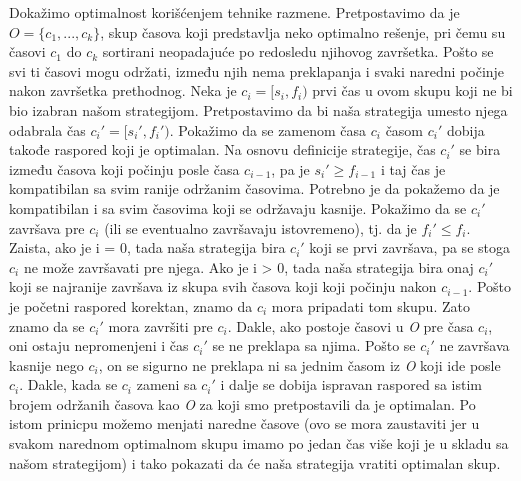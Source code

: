 \documentclass{article}
\begin{document}
Dokažimo optimalnost korišćenjem tehnike razmene. Pretpostavimo da je $O = \{c_1,..., c_k\}$, skup časova koji predstavlja neko optimalno rešenje, pri čemu
su časovi $c_1$ do $c_k$ sortirani neopadajuće po redosledu njihovog završetka. Pošto se svi ti
časovi mogu održati, između njih nema preklapanja i svaki naredni počinje nakon
završetka prethodnog. Neka je $c_i = [s_i , f_i)$ prvi čas u
ovom skupu koji ne bi bio izabran našom strategijom. Pretpostavimo da bi naša
strategija umesto njega odabrala čas $c_i' = [s_i' , f_i')$. Pokažimo da se zamenom časa
$c_i$ časom $c_i'$ dobija takođe raspored koji je optimalan. Na osnovu definicije strategije, čas $c_i'$ se bira između
časova koji počinju posle časa $c_{i-1}$, pa je $s_i' \geq f_{i-1}$ i taj čas je kompatibilan
sa svim ranije održanim časovima. Potrebno je da
pokažemo da je kompatibilan i sa svim časovima koji se održavaju kasnije. Pokažimo da se $c_i'$ završava pre $c_i$ (ili se eventualno
završavaju istovremeno), tj. da je $f_i' \leq f_i$. Zaista, ako je i = 0, tada naša
strategija bira $c_i'$ koji se prvi završava, pa se stoga $c_i$ ne može završavati pre
njega. Ako je i > 0, tada naša strategija bira onaj $c_i'$ koji se najranije završava
iz skupa svih časova koji koji počinju nakon $c_{i-1}$. Pošto je početni raspored
korektan, znamo da $c_i$ mora pripadati tom skupu.
Zato znamo da se $c_i'$ mora završiti pre $c_i$. Dakle, ako postoje
časovi u \textit{O} pre časa $c_i$, oni ostaju nepromenjeni i čas $c_i'$ se ne preklapa sa njima. Pošto se $c_i'$ ne završava kasnije nego $c_i$,
on se sigurno ne preklapa ni sa jednim časom iz \textit{O} koji ide posle $c_i$.
Dakle, kada se $c_i$ zameni sa $c_i'$ i dalje se dobija ispravan raspored sa istim brojem
održanih časova kao \textit{O} za koji smo pretpostavili da je optimalan. Po istom
prinicpu možemo menjati naredne časove (ovo se mora zaustaviti jer u svakom
narednom optimalnom skupu imamo po jedan čas više koji je u skladu sa našom
strategijom) i tako pokazati da će naša strategija vratiti optimalan skup.
\end{document}
